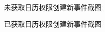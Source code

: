 \begin{figure}[!htbp]
	\centering
	\caption{未获取日历权限创建新事件截图}
	\label{fig:new_event_no_access}
\end{figure}

\begin{figure}[!htbp]
	\centering
	\caption{已获取日历权限创建新事件截图}
	\label{fig:new_event}
\end{figure}

